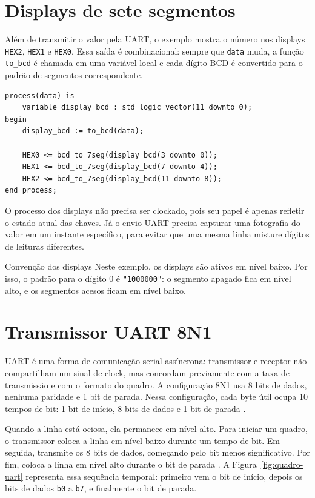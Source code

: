 \documentclass[12pt,a4paper]{book}
\begin{document}
\section{Displays de sete segmentos}

Além de transmitir o valor pela UART, o exemplo mostra o número nos displays \texttt{HEX2}, \texttt{HEX1} e \texttt{HEX0}. Essa saída é combinacional: sempre que \texttt{data} muda, a função \texttt{to\_bcd} é chamada em uma variável local e cada dígito BCD é convertido para o padrão de segmentos correspondente.

\begin{lstlisting}[caption={Processo combinacional que atualiza os displays.}]
process(data) is
    variable display_bcd : std_logic_vector(11 downto 0);
begin
    display_bcd := to_bcd(data);

    HEX0 <= bcd_to_7seg(display_bcd(3 downto 0));
    HEX1 <= bcd_to_7seg(display_bcd(7 downto 4));
    HEX2 <= bcd_to_7seg(display_bcd(11 downto 8));
end process;
\end{lstlisting}

O processo dos displays não precisa ser clockado, pois seu papel é apenas refletir o estado atual das chaves. Já o envio UART precisa capturar uma fotografia do valor em um instante específico, para evitar que uma mesma linha misture dígitos de leituras diferentes.

\begin{observacao}{Convenção dos displays}
Neste exemplo, os displays são ativos em nível baixo. Por isso, o padrão para o dígito 0 é \texttt{"1000000"}: o segmento apagado fica em nível alto, e os segmentos acesos ficam em nível baixo.
\end{observacao}

\section{Transmissor UART 8N1}

UART é uma forma de comunicação serial assíncrona: transmissor e receptor não compartilham um sinal de clock, mas concordam previamente com a taxa de transmissão e com o formato do quadro. A configuração 8N1 usa 8 bits de dados, nenhuma paridade e 1 bit de parada. Nessa configuração, cada byte útil ocupa 10 tempos de bit: 1 bit de início, 8 bits de dados e 1 bit de parada \cite{kuleuven_uart_frame}.

Quando a linha está ociosa, ela permanece em nível alto. Para iniciar um quadro, o transmissor coloca a linha em nível baixo durante um tempo de bit. Em seguida, transmite os 8 bits de dados, começando pelo bit menos significativo. Por fim, coloca a linha em nível alto durante o bit de parada \cite{kuleuven_uart_frame,mbedded_uart}. A Figura~\ref{fig:quadro-uart} representa essa sequência temporal: primeiro vem o bit de início, depois os bits de dados \texttt{b0} a \texttt{b7}, e finalmente o bit de parada.
\end{document}
